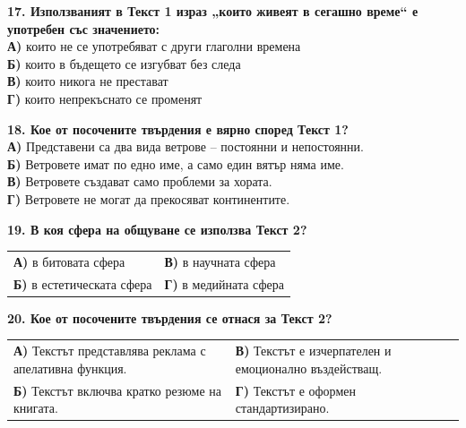 \documentclass[12pt,a4paper]{article}
\begin{document}
\vspace{0.6cm}

\noindent
\textbf{17. Използваният в Текст 1 израз „които живеят в сегашно време“ е употребен със значението:} \\
\textbf{А)} които не се употребяват с други глаголни времена \\
\textbf{Б)} които в бъдещето се изгубват без следа \\
\textbf{В)} които никога не престават \\
\textbf{Г)} които непрекъснато се променят

\vspace{0.6cm}

\noindent
\textbf{18. Кое от посочените твърдения е вярно според Текст 1?} \\
\textbf{А)} Представени са два вида ветрове – постоянни и непостоянни. \\
\textbf{Б)} Ветровете имат по едно име, а само един вятър няма име. \\
\textbf{В)} Ветровете създават само проблеми за хората. \\
\textbf{Г)} Ветровете не могат да прекосяват континентите.

\vspace{0.6cm}

\noindent
\textbf{19. В коя сфера на общуване се използва Текст 2?} \\

\vspace{-0.1cm}

\noindent
\begin{tabular}{@{}p{} p{}@{}}
\textbf{А)} в битовата сфера & \textbf{В)} в научната сфера \\
\textbf{Б)} в естетическата сфера & \textbf{Г)} в медийната сфера
\end{tabular}

\vspace{0.6cm}

\noindent
\textbf{20. Кое от посочените твърдения се отнася за Текст 2?} \\

\vspace{-0.1cm}

\noindent
\begin{tabular}{@{}p{} p{}@{}}
\textbf{А)} Текстът представлява реклама с апелативна функция. & \textbf{В)} Текстът е изчерпателен и емоционално въздействащ. \\
\textbf{Б)} Текстът включва кратко резюме на книгата. & \textbf{Г)} Текстът е оформен стандартизирано.
\end{tabular}
\end{document}
